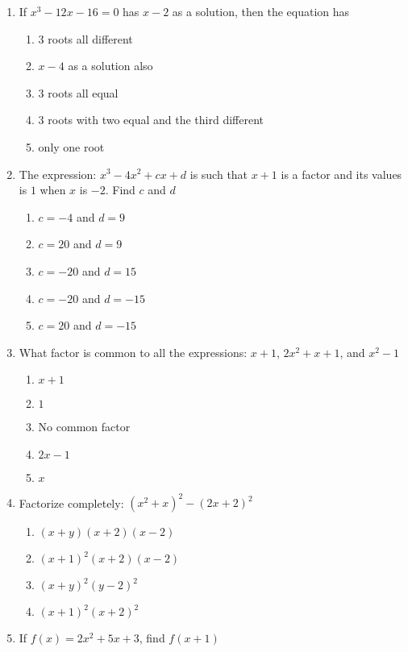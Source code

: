 \begin{multicols}{2}
\begin{enumerate}[label={\arabic*.}]
    \item If \({x}^{3} - 12x - 16 = 0\) has \(x-2\) as a solution, then the equation has
      \begin{enumerate}[label={\Alph*.}]
        \item 3 roots all different
        \item \(x-4\) as a solution also
        \item \(3\) roots all equal
        \item \(3\) roots with two equal and the third different
        \item only one root
      \end{enumerate}
    \item The expression: \({x}^{3}-4{x}^{2}+cx+d\) is such that \(x+1\) is a factor and its values is \(1\) when \(x\) is \(-2\). Find \(c\) and \(d\)
      \begin{enumerate}[label={\Alph*.}]
        \item \(c = -4\) and \(d = 9\)
        \item \(c = 20\) and \(d  = 9\)
        \item \(c = -20\) and \(d = 15\)
        \item \(c = -20\) and \(d = -15\)
        \item \(c = 20\) and \(d = -15\)
      \end{enumerate}
    \item What factor is common to all the expressions: \(x+1\), \(2{x}^{2}+x+1\), and \({x}^{2}-1\)
      \begin{enumerate}[label={\Alph*.}]
        \item \(x + 1\)
        \item \(1\)
        \item No common factor
        \item \(2x - 1\)
        \item \(x\)
      \end{enumerate}
    \item Factorize completely: \({({x}^{2}+x)}^2-{(2x+2)}^2\)
      \begin{enumerate}[label={\Alph*.}]
        \item \((x+y)(x+2)(x-2)\)
        \item \((x+1)^2(x+2)(x-2)\)
        \item \({(x+y)}^2{(y-2)}^2\)
        \item \({(x+1)}^2{(x+2)}^2\)
      \end{enumerate}
    \item If \(f(x) = 2{x}^{2}+5x+3\), find \(f(x+1)\)

\end{enumerate}
\end{multicols}
